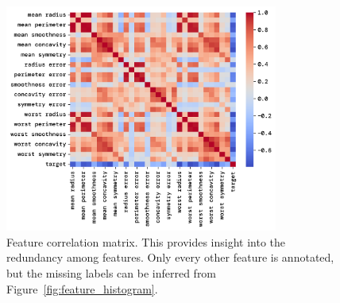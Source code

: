\documentclass[twoside,11pt]{report}
\begin{document}
    \begin{figure}[h]
        \begin{center}
            \includegraphics[width=0.8\textwidth]{../runsAndFigures/feature_correlation.png}
        \end{center}
        \caption{Feature correlation matrix. This provides insight into the redundancy among features. 
        Only every other feature is annotated, but the missing labels can be inferred from 
            Figure~\ref{fig:feature_histogram}.}\label{fig:feature_correlation}
    \end{figure}
\end{document}
